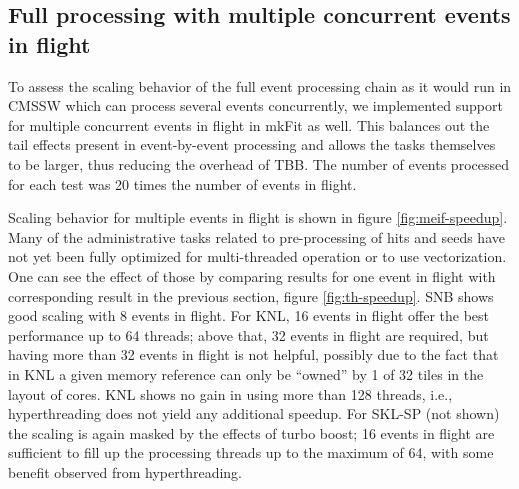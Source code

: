 \documentclass{webofc}
\def\mkfit{mkFit\xspace}
\begin{document}
\subsection{Full processing with multiple concurrent events in flight}

To assess the scaling behavior of the full event processing chain as it would
run in CMSSW which can process several events concurrently, we implemented
support for multiple concurrent events in flight in \mkfit as well. This
balances out the tail effects present in event-by-event processing and allows
the tasks themselves to be larger, thus reducing the overhead of TBB. The 
number of events processed for each test was 20 times the number of events in 
flight. 

Scaling behavior for multiple events in flight is shown in figure
\ref{fig:meif-speedup}. Many of the administrative tasks related to
pre-processing of hits and seeds have not yet been fully optimized for
multi-threaded operation or to use vectorization. One can see the effect of
those by comparing results for one event in flight with corresponding result in
the previous section, figure \ref{fig:th-speedup}. SNB shows good scaling with 8
events in flight. For KNL, 16 events in flight offer the best performance up to
64 threads; above that, 32 events in flight are required, but having more than
32 events in flight is not helpful, possibly due to the fact that in KNL a given
memory reference can only be ``owned'' by 1 of 32 tiles in the layout of cores.
KNL shows no gain in using more than 128 threads, i.e., hyperthreading does not
yield any additional speedup. For SKL-SP (not shown) the scaling is again masked by the
effects of turbo boost; 16 events in flight are sufficient to fill up the
processing threads up to the maximum of 64, with some benefit observed from
hyperthreading.
\end{document}
